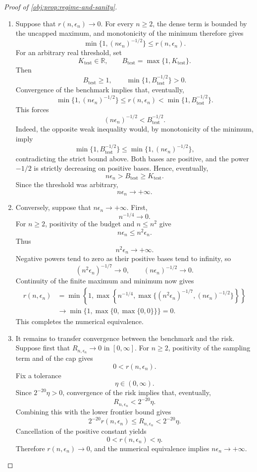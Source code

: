 \documentclass[11pt]{article}
\begin{document}
\begin{proof}[Proof of \cref{obj:prop:regime-and-sanity}]
\begin{enumerate}
\item Suppose that \(r(n,\epsilon_n)\to0\).
For every \(n\ge2\), the dense term is bounded by the uncapped maximum, and monotonicity of the minimum therefore gives
\[
\min\{1,(n\epsilon_n)^{-1/2}\}
\le r(n,\epsilon_n).
\]
For an arbitrary real threshold, set
\[
K_{\mathrm{test}}\in\mathbb R,
\qquad
B_{\mathrm{test}}=\max\{1,K_{\mathrm{test}}\}.
\]
Then
\[
B_{\mathrm{test}}\ge1,
\qquad
\min\{1,B_{\mathrm{test}}^{-1/2}\}>0.
\]
Convergence of the benchmark implies that, eventually,
\[
\min\{1,(n\epsilon_n)^{-1/2}\}
\le r(n,\epsilon_n)
<\min\{1,B_{\mathrm{test}}^{-1/2}\}.
\]
This forces
\[
(n\epsilon_n)^{-1/2}<B_{\mathrm{test}}^{-1/2}.
\]
Indeed, the opposite weak inequality would, by monotonicity of the minimum, imply
\[
\min\{1,B_{\mathrm{test}}^{-1/2}\}
\le\min\{1,(n\epsilon_n)^{-1/2}\},
\]
contradicting the strict bound above.
Both bases are positive, and the power \(-1/2\) is strictly decreasing on positive bases. Hence, eventually,
\[
n\epsilon_n>B_{\mathrm{test}}\ge K_{\mathrm{test}}.
\]
Since the threshold was arbitrary,
\[
n\epsilon_n\longrightarrow+\infty.
\]

\item Conversely, suppose that \(n\epsilon_n\to+\infty\).
First,
\[
n^{-1/4}\longrightarrow0.
\]
For \(n\ge2\), positivity of the budget and \(n\le n^2\) give
\[
n\epsilon_n\le n^2\epsilon_n.
\]
Thus
\[
n^2\epsilon_n\longrightarrow+\infty.
\]
Negative powers tend to zero as their positive bases tend to infinity, so
\[
(n^2\epsilon_n)^{-1/7}\longrightarrow0,
\qquad
(n\epsilon_n)^{-1/2}\longrightarrow0.
\]
Continuity of the finite maximum and minimum now gives
\[
\begin{aligned}
r(n,\epsilon_n)
&=\min\left\{1,\max\left\{
n^{-1/4},
\max\{(n^2\epsilon_n)^{-1/7},(n\epsilon_n)^{-1/2}\}
\right\}\right\}\\
&\longrightarrow
\min\{1,\max\{0,\max\{0,0\}\}\}=0.
\end{aligned}
\]
This completes the numerical equivalence.

\item It remains to transfer convergence between the benchmark and the risk.
Suppose first that \(R_{n,\epsilon_n}\to0\) in \([0,\infty]\).
For \(n\ge2\), positivity of the sampling term and of the cap gives
\[
0<r(n,\epsilon_n).
\]
Fix a tolerance
\[
\eta\in(0,\infty).
\]
Since \(2^{-20}\eta>0\), convergence of the risk implies that, eventually,
\[
R_{n,\epsilon_n}<2^{-20}\eta.
\]
Combining this with the lower frontier bound gives
\[
2^{-20}r(n,\epsilon_n)
\le R_{n,\epsilon_n}
<2^{-20}\eta.
\]
Cancellation of the positive constant yields
\[
0<r(n,\epsilon_n)<\eta.
\]
Therefore \(r(n,\epsilon_n)\to0\), and the numerical equivalence implies
\(n\epsilon_n\to+\infty\).


\end{enumerate}
\end{proof}
\end{document}
